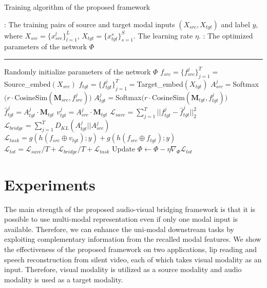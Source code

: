 \documentclass[10pt,twocolumn,letterpaper]{article}
\begin{document}
\makeatletter
\renewcommand{\ALG@beginalgorithmic}{\small}
\algrenewcommand{}
\makeatother
\begin{algorithm}[t!]
  \caption{Training algorithm of the proposed framework}
    \label{alg:1}
    \begin{algorithmic}[1]
        : The training pairs of source and target modal inputs $(X_{src}, X_{tgt})$ and label $y$, where $X_{src} = \{x^{l}_{src}\}_{l=1}^L$, $X_{tgt}=\{x^{s}_{tgt}\}_{s=1}^S$. The learning rate $\eta$.
        : The optimized parameters of the network $\Phi$
        \vspace{0.05in}
        \hrule
        \vspace{0.05in}
        \State Randomly initialize parameters of the network $\Phi$
            \State ${f}_{src}=\{{f}^j_{src}\}_{j=1}^T=$Source\_embed$(X_{src})$
            \State ${f}_{tgt}=\{{f}^j_{tgt}\}_{j=1}^T=$Target\_embed$(X_{tgt})$
                \State $A^j_{src} = $Softmax$(r\cdot$CosineSim$(\mathbf{M}_{src},f^j_{src}))$
                \State $A^j_{tgt} = $Softmax$(r\cdot$CosineSim$(\mathbf{M}_{tgt},f^j_{tgt}))$
                \State $\hat{f}^j_{tgt} = A^j_{tgt} \cdot \mathbf{M}_{tgt}$ 
                \State $v^j_{tgt} = A^j_{src} \cdot \mathbf{M}_{tgt}$
            \EndFor
        \State $\mathcal{L}_{save}=\sum_{j=1}^{T}||f^j_{tgt} - \hat{f}^j_{tgt}||^2_2$    
        \State $\mathcal{L}_{bridge}=\sum_{j=1}^{T}D_{KL}(A^j_{tgt}||A^j_{src})$  
        \State $\mathcal{L}_{task}=g(h(f_{src}\oplus v_{tgt});y) + g(h(f_{src}\oplus f_{tgt});y)$
        \State $\mathcal{L}_{tot} = \mathcal{L}_{save} / T + \mathcal{L}_{bridge} / T + \mathcal{L}_{task}$
        \State Update $\Phi \leftarrow \Phi -  \eta \nabla_{\Phi} \mathcal{L}_{tot}$
        \EndFor
    \end{algorithmic}
\end{algorithm}



\section{Experiments}
The main strength of the proposed audio-visual bridging framework is that it is possible to use multi-modal representation even if only one modal input is available. Therefore, we can enhance the uni-modal downstream tasks by exploiting complementary information from the recalled modal features. We show the effectiveness of the proposed framework on two applications, lip reading and speech reconstruction from silent video, each of which takes visual modality as an input. Therefore, visual modality is utilized as a source modality and audio modality is used as a target modality.
\end{document}
